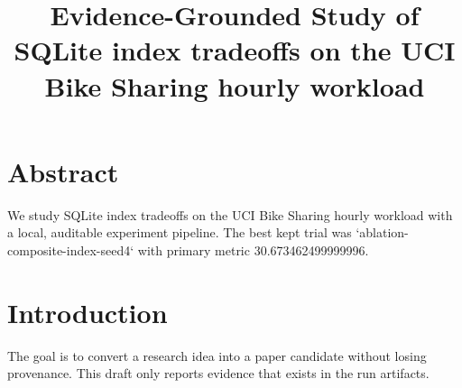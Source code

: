 \documentclass{article}
\begin{document}
\title{Evidence-Grounded Study of SQLite index tradeoffs on the UCI Bike Sharing hourly workload}
\maketitle

\section{Abstract}
We study SQLite index tradeoffs on the UCI Bike Sharing hourly workload with a local, auditable experiment pipeline. The best kept trial was `ablation-composite-index-seed4` with primary metric 30.673462499999996.

\section{Introduction}
The goal is to convert a research idea into a paper candidate without losing provenance.
This draft only reports evidence that exists in the run artifacts.
\end{document}
